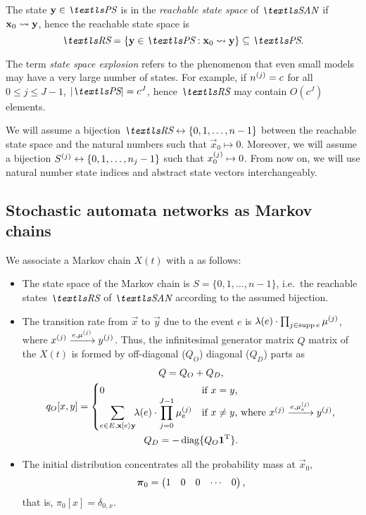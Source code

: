 The state $\vec{y} \in \PS$ is in the \emph{reachable state space} of
$\SAN$ if $\vec{x}_0 \reachto \vec{y}$, hence the reachable state
space is
\begin{equation}
  \RS = \{ \vec{y} \in \PS : \vec{x}_0 \reachto \vec{y} \} \subseteq
  \PS \text.
\end{equation}

The term \emph{state space explosion} refers to the phenomenon that
even small models may have a very large number of states. For example,
if $\loc{n}{j} = c$ for all $0 \le j \le J - 1$, $\lvert \PS \rvert =
c^J$, hence $\RS$ may contain $O(c^J)$ elements.

We will assume a bijection
$\RS \leftrightarrow \{0, 1, \ldots, n - 1 \}$ between the reachable
state space and the natural numbers such that $\vec{x}_0 \mapsto 0$.
Moreover, we will assume a bijection
$\loc{S}{j} \leftrightarrow \{0, 1, \ldots, n_j - 1\}$ such that
$\loc{x_0}{j} \mapsto 0$. From now on, we will use natural number
state indices and abstract state vectors interchangeably.

\subsection{Stochastic automata networks as Markov chains}

We associate a Markov chain $X(t)$ with a  as follows:
\begin{itemize}
\item The state space of the Markov chain is $S = \{0, 1, \ldots, n -
  1\}$, i.e.~the reachable states $\RS$ of $\SAN$ according to the
  assumed bijection.
\item The transition rate from $\vec{x}$ to $\vec{y}$ due to the event
  $e$ is $\lambda(e) \cdot \prod_{j \in \supp e} \loc{\mu}{j}$, where
  $\loc{x}{j} \xrightarrow{e, \loc{\mu}{j}} \loc{y}{j}$. Thus, the
  infinitesimal generator matrix $Q$ matrix of the $X(t)$ is formed
  by off-diagonal ($Q_O$) diagonal ($Q_D$) parts as
  \begin{gather}
    Q = Q_O + Q_D \text, \\
    q_O[x, y] = \begin{cases}
      0 & \text{if $x = y$,} \\
      \displaystyle \sum_{e \in E, \vec{x} \tranto{e} \vec{y}} \!\!
      \lambda(e) \cdot \prod_{j = 0\vphantom{[}}^{J - 1} \loc{\mu_e}{j} &
      \text{if $x \ne y$, where $\loc{x}{j}
        \xrightarrow{e, \loc{\mu_e}{j}} \loc{y}{j}$,}
    \end{cases} \\
    Q_D = - \diag \{ Q_O \vec{1}^\T \} \text. \\
  \end{gather}
\item The initial distribution concentrates all the probability mass
  at $\vec{x}_0$,
  \begin{equation}
    \vec{\pi}_0 = \begin{pmatrix}
      1 & 0 & 0 & \cdots & 0
    \end{pmatrix}\text,
  \end{equation}
  that is, $\pi_0[x] = \delta_{0,x}$.
\end{itemize}

